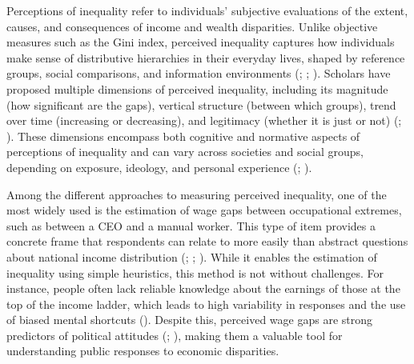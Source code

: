 \documentclass[
  12pt,
]{article}
\begin{document}
Perceptions of inequality refer to individuals' subjective evaluations
of the extent, causes, and consequences of income and wealth
disparities. Unlike objective measures such as the Gini index, perceived
inequality captures how individuals make sense of distributive
hierarchies in their everyday lives, shaped by reference groups, social
comparisons, and information environments
(; ; ).
Scholars have proposed multiple dimensions of perceived inequality,
including its magnitude (how significant are the gaps), vertical
structure (between which groups), trend over time (increasing or
decreasing), and legitimacy (whether it is just or not)
(;
). These dimensions encompass both cognitive and normative aspects
of perceptions of inequality and can vary across societies and social
groups, depending on exposure, ideology, and personal experience
(;
).

Among the different approaches to measuring perceived inequality, one of
the most widely used is the estimation of wage gaps between occupational
extremes, such as between a CEO and a manual worker. This type of item
provides a concrete frame that respondents can relate to more easily
than abstract questions about national income distribution
(;
;
). While it
enables the estimation of inequality using simple heuristics, this
method is not without challenges. For instance, people often lack
reliable knowledge about the earnings of those at the top of the income
ladder, which leads to high variability in responses and the use of
biased mental shortcuts (). Despite this, perceived wage gaps are strong predictors of
political attitudes
(; ),
making them a valuable tool for understanding public responses to
economic disparities.
\end{document}
